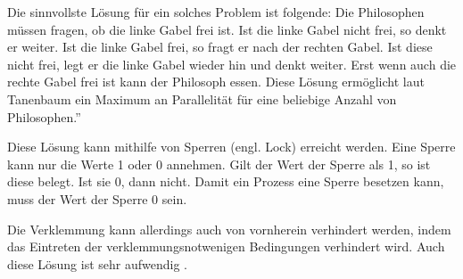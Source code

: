 Die sinnvollste Lösung für ein solches Problem ist folgende: Die Philosophen müssen fragen, ob die linke Gabel frei ist. Ist die linke Gabel nicht frei, so denkt er weiter. Ist die linke Gabel frei, so fragt er nach der rechten Gabel. Ist diese nicht frei, legt er die linke Gabel wieder hin und denkt weiter. Erst wenn auch die rechte Gabel frei ist kann der Philosoph essen. Diese Lösung ermöglicht laut Tanenbaum \glqq ein Maximum an Parallelität für eine beliebige Anzahl von Philosophen.''\parencite[S.222]{tanenbaum2016}

Diese Lösung kann mithilfe von Sperren (engl. Lock) erreicht werden. Eine Sperre kann nur die Werte 1 oder 0 annehmen. Gilt der Wert der Sperre als 1, so ist diese belegt. Ist sie 0, dann nicht. Damit ein Prozess eine Sperre besetzen kann,  muss der Wert der Sperre 0 sein\parencite[vgl.][S.148]{mandl2020}.

Die Verklemmung kann allerdings auch von vornherein verhindert werden, indem das Eintreten der verklemmungsnotwenigen Bedingungen verhindert wird. Auch diese Lösung ist sehr aufwendig \parencite[vgl. ][S.79]{mandl2020}.

















